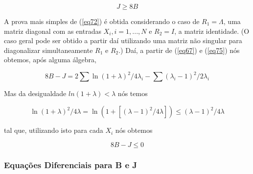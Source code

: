 \documentclass{sbrt2017port}
\begin{document}
\begin{equation}
	J \geq 8B
	\label{eq72}
\end{equation}

A prova mais simples de (\ref{eq72}) é obtida considerando o caso de $R_1=\Lambda$, uma matriz diagonal com as entradas $X_i, i=1,...,N$ e $R_2=I$, a matriz identidade. (O caso geral pode ser obtido a partir daí utilizando uma matriz não singular para diagonalizar simultaneamente $R_1$ e $R_2$.) Daí, a partir de (\ref{eq67}) e (\ref{eq75}) nós obtemos, após alguma álgebra,

\begin{equation*}
	8B - J = 2\sum \ln(1 + \lambda)^2/4\lambda_i - \sum (\lambda_i - 1)^2/2\lambda_i
\end{equation*}

Mas da desigualdade $ln (1+\lambda) < \lambda$ nós temos

\begin{equation}
	\ln(1 + \lambda)^2/4\lambda = \ln(1 + [(\lambda-1)^2/4\lambda]) \leq (\lambda-1)^2/4\lambda
	\label{eq73}
\end{equation}

tal que, utilizando isto para cada $X_i$ nós obtemos

\begin{equation*}
	8B - J \leq 0
\end{equation*}

\subsubsection{Equações Diferenciais para B e J}
\end{document}

